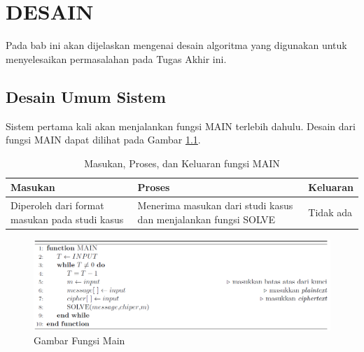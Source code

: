 \chapter{DESAIN}
\label{chapter:design}
Pada bab ini akan dijelaskan mengenai desain algoritma yang digunakan untuk menyelesaikan permasalahan pada Tugas Akhir ini.
\section{Desain Umum Sistem}	
Sistem pertama kali akan menjalankan fungsi MAIN terlebih dahulu. Desain dari fungsi MAIN dapat dilihat pada Gambar \ref{fig:mainfx}. %
	
	  \begin{table}[H]
	 	\caption{Masukan, Proses, dan Keluaran fungsi MAIN}
		\begin{tabular}   {|p{2.5cm}|p{4cm}|p{2cm}|}\hline
		Masukan&Proses&Keluaran \\ \hline
		Diperoleh dari format masukan pada studi kasus&Menerima masukan dari studi kasus dan menjalankan fungsi SOLVE &Tidak ada \\ \hline
		\end{tabular}%
		\label{tab:iomain}
	\end{table}

\begin{figure}[H]
		\centering
		
		\includegraphics[scale=0.31]{images/bab3/mainfx.png}
		\caption{Gambar Fungsi Main}
		\label{fig:mainfx}
	\end{figure}
	
